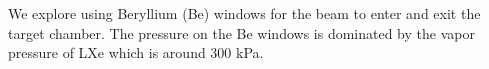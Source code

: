 \documentclass[
reprint,
nofootinbib,
amsmath, amssymb,
aps,
floatfix,
]{revtex4-2}
\begin{document}
We explore using Beryllium (Be) windows for the beam to enter and exit the target chamber.
The pressure on the Be windows is dominated by the vapor pressure of LXe which is around 300 kPa.
\end{document}
